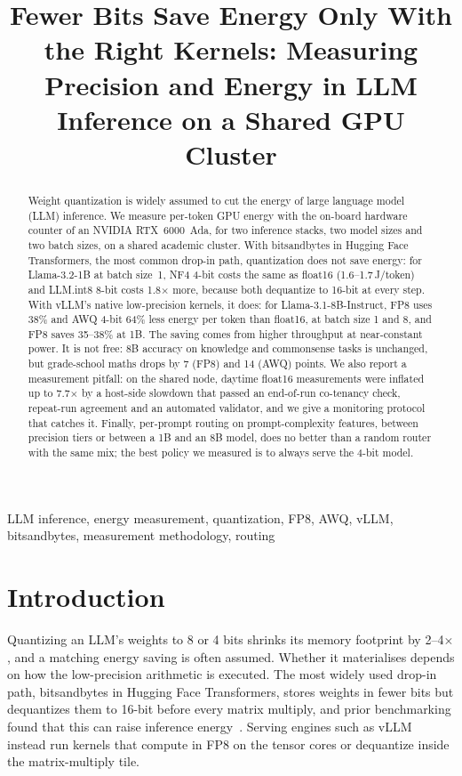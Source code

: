 \documentclass[conference]{IEEEtran}
\begin{document}
\title{Fewer Bits Save Energy Only With the Right Kernels: Measuring Precision and Energy in LLM Inference on a Shared GPU Cluster}

\author{}

\maketitle

\begin{abstract}
Weight quantization is widely assumed to cut the energy of large language model (LLM) inference. We measure per-token GPU energy with the on-board hardware counter of an NVIDIA RTX~6000~Ada, for two inference stacks, two model sizes and two batch sizes, on a shared academic cluster. With bitsandbytes in Hugging Face Transformers, the most common drop-in path, quantization does not save energy: for Llama-3.2-1B at batch size~1, NF4 4-bit costs the same as float16 (1.6--1.7\,J/token) and LLM.int8 8-bit costs 1.8$\times$ more, because both dequantize to 16-bit at every step. With vLLM's native low-precision kernels, it does: for Llama-3.1-8B-Instruct, FP8 uses 38\% and AWQ 4-bit 64\% less energy per token than float16, at batch size 1 and 8, and FP8 saves 35--38\% at 1B. The saving comes from higher throughput at near-constant power. It is not free: 8B accuracy on knowledge and commonsense tasks is unchanged, but grade-school maths drops by 7 (FP8) and 14 (AWQ) points. We also report a measurement pitfall: on the shared node, daytime float16 measurements were inflated up to 7.7$\times$ by a host-side slowdown that passed an end-of-run co-tenancy check, repeat-run agreement and an automated validator, and we give a monitoring protocol that catches it. Finally, per-prompt routing on prompt-complexity features, between precision tiers or between a 1B and an 8B model, does no better than a random router with the same mix; the best policy we measured is to always serve the 4-bit model.
\end{abstract}

\begin{IEEEkeywords}
LLM inference, energy measurement, quantization, FP8, AWQ, vLLM, bitsandbytes, measurement methodology, routing
\end{IEEEkeywords}

\section{Introduction}
Quantizing an LLM's weights to 8 or 4 bits shrinks its memory footprint by 2--4$\times$, and a matching energy saving is often assumed. Whether it materialises depends on how the low-precision arithmetic is executed. The most widely used drop-in path, bitsandbytes in Hugging Face Transformers, stores weights in fewer bits but dequantizes them to 16-bit before every matrix multiply, and prior benchmarking found that this can raise inference energy~\cite{poddar2025}. Serving engines such as vLLM~\cite{kwon2023vllm} instead run kernels that compute in FP8 on the tensor cores or dequantize inside the matrix-multiply tile.
\end{document}
